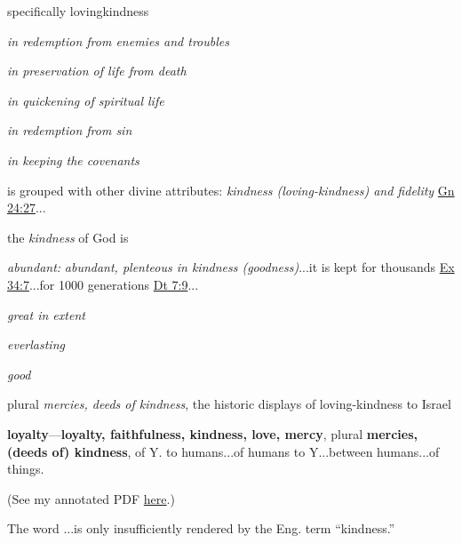 \begin{compactdesc}
\begin{compactitem}
							\item[II.1] specifically lovingkindness
							\item[II.1.a] \textit{in redemption from enemies and troubles}
							\item[II.1.b] \textit{in preservation of life from death}
							\item[II.1.c] \textit{in quickening of spiritual life}
							\item[II.1.d] \textit{in redemption from sin}
							\item[II.1.e] \textit{in keeping the covenants}
							\item[II.2]  is grouped with other divine attributes:  \textit{kindness (loving-kindness) and fidelity} \hyperref[GENESIS-24-27]{Gn 24:27}...
							\item[II.3] the \textit{kindness} of God is
							\item[II.3.a] \textit{abundant:}  \textit{abundant, plenteous in kindness (goodness)}...it is kept for thousands \hyperref[EXODUS-34-7]{Ex 34:7}...for 1000 generations \hyperref[DEUTERONOMY-7-9]{Dt 7:9}...
							\item[II.3.b] \textit{great in extent}
							\item[II.3.c] \textit{everlasting}
							\item[II.3.d] \textit{good}
							\item[II.4] plural \textit{mercies, deeds of kindness}, the historic displays of loving-kindness to Israel
						\end{compactitem}
					\item[DCH PDF 1412] \phantom{.}
						\begin{compactitem}
							\item \textbf{loyalty}---\textbf{loyalty, faithfulness, kindness, love, mercy}, plural \textbf{mercies, (deeds of) kindness}, of Y. to humans...of humans to Y...between humans...of things.
						\end{compactitem}
					\item[TDOT] (See my annotated PDF \href{https://drive.google.com/file/d/1oe9t0mj7ZDi8Yf0bM4C4g2NB0uM5sfIH/view?usp=share_link}{here}.)
					\item[TLOT] \phantom{.}
						\begin{compactdesc}
							\item[PDF 596] The word ...is only insufficiently rendered by the Eng. term ``kindness.''

\end{compactdesc}
\end{compactdesc}
